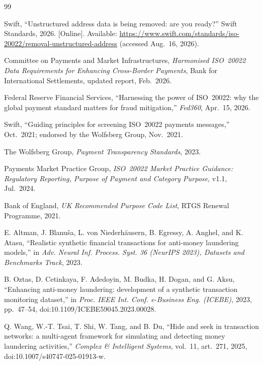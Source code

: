 \documentclass[conference]{IEEEtran}
\begin{document}
\setlength{\IEEEbibitemsep}{0pt}
\begin{thebibliography}{99}
\scriptsize

Swift, ``Unstructured address data is being removed: are you ready?'' Swift
Standards, 2026. [Online]. Available:
\url{https://www.swift.com/standards/iso-20022/removal-unstructured-address}
(accessed Aug.~16, 2026).

Committee on Payments and Market Infrastructures, \emph{Harmonised ISO~20022
Data Requirements for Enhancing Cross-Border Payments}, Bank for
International Settlements, updated report, Feb.~2026.

Federal Reserve Financial Services, ``Harnessing the power of ISO~20022: why
the global payment standard matters for fraud mitigation,'' \emph{Fed360},
Apr.~15, 2026.

Swift, ``Guiding principles for screening ISO~20022 payments messages,''
Oct.~2021; endorsed by the Wolfsberg Group, Nov.~2021.

The Wolfsberg Group, \emph{Payment Transparency Standards}, 2023.

Payments Market Practice Group, \emph{ISO~20022 Market Practice Guidance:
Regulatory Reporting, Purpose of Payment and Category Purpose}, v1.1,
Jul.~2024.

Bank of England, \emph{UK Recommended Purpose Code List}, RTGS Renewal
Programme, 2021.

E. Altman, J. Blanuša, L. von Niederhäusern, B. Egressy, A. Anghel, and
K. Atasu, ``Realistic synthetic financial transactions for anti-money
laundering models,'' in \emph{Adv. Neural Inf. Process. Syst. 36 (NeurIPS
2023), Datasets and Benchmarks Track}, 2023.

B. Oztas, D. Cetinkaya, F. Adedoyin, M. Budka, H. Dogan, and G. Aksu,
``Enhancing anti-money laundering: development of a synthetic transaction
monitoring dataset,'' in \emph{Proc. IEEE Int. Conf. e-Business Eng.
(ICEBE)}, 2023, pp.~47--54, doi:10.1109/ICEBE59045.2023.00028.

Q. Wang, W.-T. Tsai, T. Shi, W. Tang, and B. Du, ``Hide and seek in
transaction networks: a multi-agent framework for simulating and detecting
money laundering activities,'' \emph{Complex \& Intelligent Systems},
vol.~11, art.~271, 2025, doi:10.1007/s40747-025-01913-w.


\end{thebibliography}
\end{document}
